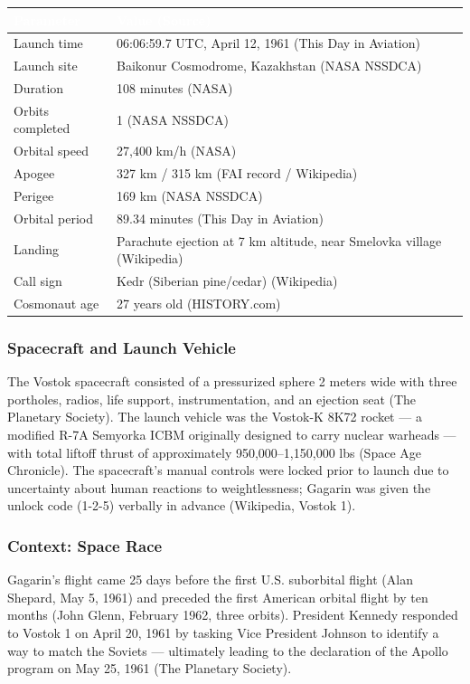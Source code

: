 \documentclass[11pt,letterpaper]{article}
\newcommand{\tableheader}[1]{\textbf{\sffamily\textcolor{white}{#1}}}
\begin{document}
\begin{center}
\begin{tabularx}{\textwidth}{L{4cm}X}
\toprule
{}
\tableheader{Parameter} & \tableheader{Value (Source)} \\
\midrule
Launch time & 06:06:59.7 UTC, April 12, 1961 (This Day in Aviation) \\
Launch site & Baikonur Cosmodrome, Kazakhstan (NASA NSSDCA) \\
Duration & 108 minutes (NASA) \\
Orbits completed & 1 (NASA NSSDCA) \\
Orbital speed & 27,400 km/h (NASA) \\
Apogee & 327 km / 315 km (FAI record / Wikipedia) \\
Perigee & 169 km (NASA NSSDCA) \\
Orbital period & 89.34 minutes (This Day in Aviation) \\
Landing & Parachute ejection at 7 km altitude, near Smelovka village (Wikipedia) \\
Call sign & Kedr (Siberian pine/cedar) (Wikipedia) \\
Cosmonaut age & 27 years old (HISTORY.com) \\
\bottomrule
\end{tabularx}
\end{center}

\subsubsection{Spacecraft and Launch Vehicle}

The Vostok spacecraft consisted of a pressurized sphere 2 meters wide with three portholes, radios, life support, instrumentation, and an ejection seat (The Planetary Society). The launch vehicle was the Vostok-K 8K72 rocket — a modified R-7A Semyorka ICBM originally designed to carry nuclear warheads — with total liftoff thrust of approximately 950,000--1,150,000 lbs (Space Age Chronicle). The spacecraft's manual controls were locked prior to launch due to uncertainty about human reactions to weightlessness; Gagarin was given the unlock code (1-2-5) verbally in advance (Wikipedia, Vostok 1).

\subsubsection{Context: Space Race}

Gagarin's flight came 25 days before the first U.S. suborbital flight (Alan Shepard, May 5, 1961) and preceded the first American orbital flight by ten months (John Glenn, February 1962, three orbits). President Kennedy responded to Vostok 1 on April 20, 1961 by tasking Vice President Johnson to identify a way to match the Soviets — ultimately leading to the declaration of the Apollo program on May 25, 1961 (The Planetary Society).
\end{document}

